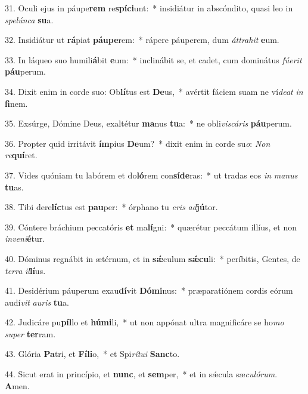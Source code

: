 31. Oculi ejus in páupe\textbf{rem} re\textbf{spí}\textbf{ci}unt:~*  insidiátur in abscóndito, quasi leo in \textit{spe}\textit{lún}\textit{ca} \textbf{su}a.\

32. Insidiátur ut \textbf{rá}piat \textbf{páu}\textbf{pe}rem:~*  rápere páuperem, dum \textit{át}\textit{tra}\textit{hit} \textbf{e}um.\

33. In láqueo suo humili\textbf{á}bit \textbf{e}um:~*  inclinábit se, et cadet, cum dominátus \textit{fú}\textit{e}\textit{rit} \textbf{páu}perum.\

34. Dixit enim in corde suo: Ob\textbf{lí}tus est \textbf{De}us,~*  avértit fáciem suam ne ví\textit{de}\textit{at} \textit{in} \textbf{fi}nem.\

35. Exsúrge, Dómine Deus, exaltétur \textbf{ma}nus \textbf{tu}a:~*  ne obli\textit{vis}\textit{cá}\textit{ris} \textbf{páu}perum.\

36. Propter quid irritávit \textbf{ím}pius \textbf{De}um?~*  dixit enim in corde su\textit{o}: \textit{Non} \textit{re}\textbf{quí}ret.\

37. Vides quóniam tu labórem et do\textbf{ló}rem con\textbf{sí}\textbf{de}ras:~*  ut tradas eos \textit{in} \textit{ma}\textit{nus} \textbf{tu}as.\

38. Tibi dere\textbf{líc}tus est \textbf{pau}per:~*  órphano tu \textit{e}\textit{ris} \textit{ad}\textbf{jú}tor.\

39. Cóntere bráchium peccatóris \textbf{et} ma\textbf{lí}gni:~*  quærétur peccátum illíus, et non \textit{in}\textit{ve}\textit{ni}\textbf{é}tur.\

40. Dóminus regnábit in ætérnum, et in \textbf{sǽ}culum \textbf{sǽ}\textbf{cu}li:~*  períbitis, Gentes, de \textit{ter}\textit{ra} \textit{il}\textbf{lí}us.\

41. Desidérium páuperum exau\textbf{dí}vit \textbf{Dó}\textbf{mi}nus:~*  præparatiónem cordis eórum audí\textit{vit} \textit{au}\textit{ris} \textbf{tu}a.\

42. Judicáre pu\textbf{píl}lo et \textbf{hú}\textbf{mi}li,~*  ut non appónat ultra magnificáre se ho\textit{mo} \textit{su}\textit{per} \textbf{ter}ram.\

43. Glória \textbf{Pa}tri, et \textbf{Fí}\textbf{li}o,~*  et Spi\textit{rí}\textit{tu}\textit{i} \textbf{Sanc}to.\

44. Sicut erat in princípio, et \textbf{nunc}, et \textbf{sem}per,~*  et in sǽcula sæ\textit{cu}\textit{ló}\textit{rum}. \textbf{A}men.\

